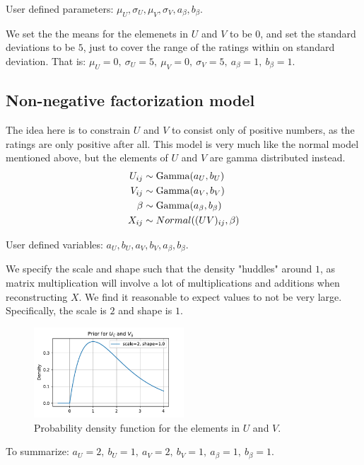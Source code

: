 \documentclass[12pt]{article}
\begin{document}
    User defined parameters: $\mu_U, \sigma_U, \mu_V, \sigma_V, a_\beta, b_\beta$.
    
    \vspace{3mm}
    We set the the means for the elemenets in $U$ and $V$ to be $0$, and set the standard deviations to be $5$, just to cover the range of the ratings within on standard deviation. That is: $\mu_U=0,\ \sigma_U=5,\ \mu_V=0,\ \sigma_V=5,\ a_\beta=1,\ b_\beta=1$.

    \subsection{Non-negative factorization model}
    The idea here is to constrain $U$ and $V$ to consist only of positive numbers, as the ratings are only positive after all. This model is very much like the normal model mentioned above, but the elements of $U$ and $V$ are gamma distributed instead.
    \begin{align*}
        U_{ij} &\sim \operatorname{Gamma}(a_U, b_U) \\
        V_{ij} &\sim \operatorname{Gamma}(a_V, b_V) \\
        \beta  &\sim \operatorname{Gamma}(a_\beta, b_\beta) \\
        X_{ij} &\sim Normal((UV)_{ij}, \beta) 
    \end{align*}

    User defined variables: $a_U, b_U, a_V, b_V, a_\beta, b_\beta$.
    
    \vspace{3mm}
    We specify the scale and shape such that the density "huddles" around $1$, as matrix multiplication will involve a lot of multiplications and additions when reconstructing $X$. We find it reasonable to expect values to not be very large. Specifically, the scale is $2$ and shape is $1$.
    \begin{figure}[H]
        \centering
        \includegraphics[width=0.5\textwidth]{nmfprior.pdf}
        \caption{Probability density function for the elements in $U$ and $V$.}
    \end{figure}
    To summarize: $a_U=2,\ b_U=1,\ a_V=2,\ b_V=1,\ a_\beta=1,\ b_\beta=1$.
\end{document}

